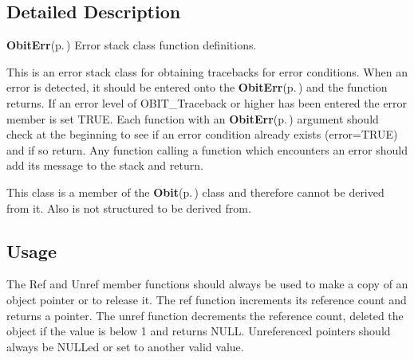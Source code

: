 

\subsection{Detailed Description}
{\bf Obit\-Err}{\rm (p.\,\pageref{structObitErr})} Error stack class function definitions. 

This is an error stack class for obtaining tracebacks for error conditions. When an error is detected, it should be entered onto the {\bf Obit\-Err}{\rm (p.\,\pageref{structObitErr})} and the function returns. If an error level of OBIT\_\-Traceback or higher has been entered the error member is set TRUE. Each function with an {\bf Obit\-Err}{\rm (p.\,\pageref{structObitErr})} argument should check at the beginning to see if an error condition already exists (error=TRUE) and if so return. Any function calling a function which encounters an error should add its message to the stack and return.

This class is a member of the {\bf Obit}{\rm (p.\,\pageref{structObit})} class and therefore cannot be derived from it. Also is not structured to be derived from.\subsection{Usage}\label{ObitErr_8h_ObitErrUsage}
The Ref and Unref member functions should always be used to make a copy of an object pointer or to release it. The ref function increments its reference count and returns a pointer. The unref function decrements the reference count, deleted the object if the value is below 1 and returns NULL. Unreferenced pointers should always be NULLed or set to another valid value.

